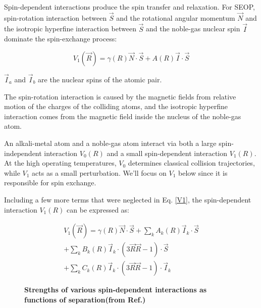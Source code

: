 Spin-dependent interactions produce the spin transfer and relaxation. For SEOP, spin-rotation interaction between $\vec{S}$ and the rotational angular momentum $\vec{N}$ and the isotropic hyperfine interaction between $\vec{S}$ and the noble-gas nuclear spin $\vec{I}$ dominate the spin-exchange process:

\begin{equation}\label{V1}
V_{1}(\vec{R})=\gamma(R)\vec{N}\cdot \vec{S}+A(R)\vec{I}\cdot \vec{S}
\end{equation}

$\vec{I}_{a}$ and $\vec{I}_{b}$ are the nuclear spins of the atomic pair.

The spin-rotation interaction is caused by the magnetic fields from relative motion of the charges of the colliding atoms, and the isotropic hyperfine interaction comes from the magnetic field inside the nucleus of the noble-gas atom. 

An alkali-metal atom and a noble-gas atom interact via both a large spin-independent interaction $V_{0}(R)$ and a small spin-dependent interaction $V_{1}(R)$. At the high operating temperatures, $V_{0}$ determines classical collision trajectories, while $V_{1}$ acts as a small perturbation. We'll focus on $V_{1}$ below since it is responsible for spin exchange.

Including a few more terms that were neglected in Eq. \ref{V1}, the spin-dependent interaction $V_{1}(R)$ can be expressed as:

\begin{equation}
\begin{split}
V_{1}(\vec{R})=\gamma(R)\vec{N}\cdot \vec{S}+\sum_{k}A_{k}(R)\vec{I}_{k}\cdot \vec{S}\\
+\sum_{k}B_{k}(R)\vec{I}_{k}\cdot (3\vec{R}\vec{R}-1)\cdot \vec{S}\\
+\sum_{k}C_{k}(R)\vec{I}_{k}\cdot (3\vec{R}\vec{R}-1)\cdot \vec{I}_{k}
\end{split}
\end{equation}

\begin{figure}[H]
	\centering
	\caption{{\bf Strengths of various spin-dependent interactions as functions of separation(from Ref.\@ \cite{WalkerHapper})}}
	\label{SpinExchange}
\end{figure}

